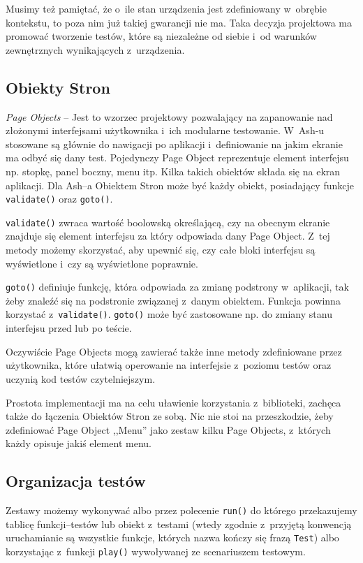 \documentclass[brudnopis]{xmgr}
\begin{document}
Musimy też pamiętać, że o~ile stan urządzenia jest zdefiniowany w~obrębie kontekstu, to poza nim już takiej gwarancji nie ma. Taka decyzja projektowa ma promować tworzenie testów, które są  niezależne od siebie i~od warunków zewnętrznych wynikających z~urządzenia.

\subsection{Obiekty Stron} 

\textit{Page Objects} -- Jest to wzorzec projektowy pozwalający na zapanowanie nad złożonymi interfejsami użytkownika i~ich modularne testowanie. W~Ash-u stosowane są głównie do nawigacji po aplikacji i~definiowanie na jakim ekranie ma odbyć się dany test. Pojedynczy Page Object reprezentuje element interfejsu np. stopkę, panel boczny, menu itp. Kilka takich obiektów składa się na ekran aplikacji. Dla Ash--a Obiektem Stron może być każdy obiekt, posiadający funkcje \texttt{validate()} oraz \texttt{goto()}.

\texttt{validate()} zwraca wartość boolowską określającą, czy na obecnym ekranie znajduje się element interfejsu za który odpowiada dany Page Object. Z~tej metody możemy skorzystać, aby upewnić się, czy całe bloki interfejsu są wyświetlone i~czy są wyświetlone poprawnie.

\texttt{goto()} definiuje funkcję, która odpowiada za zmianę podstrony w~aplikacji, tak żeby znaleźć się na podstronie związanej z~danym obiektem. Funkcja powinna korzystać z~\texttt{validate()}. \texttt{goto()} może być zastosowane np. do zmiany stanu interfejsu przed lub po teście.

Oczywiście Page Objects mogą zawierać także inne metody zdefiniowane przez użytkownika, które ułatwią operowanie na interfejsie z~poziomu testów oraz uczynią kod testów czytelniejszym.

Prostota implementacji ma na celu uławienie korzystania z~biblioteki, zachęca także do łączenia Obiektów Stron ze sobą. Nic nie stoi na przeszkodzie, żeby zdefiniować Page Object ,,Menu'' jako zestaw kilku Page Objects, z~których każdy opisuje jakiś element menu. 

\subsection{Organizacja testów}

Zestawy możemy wykonywać albo przez polecenie \texttt{run()} do którego przekazujemy tablicę funkcji--testów lub obiekt z~testami (wtedy zgodnie z~przyjętą konwencją uruchamianie są wszystkie funkcje, których nazwa kończy się frazą \texttt{Test}) albo korzystając z~funkcji \texttt{play()} wywoływanej ze scenariuszem testowym.
\end{document}
